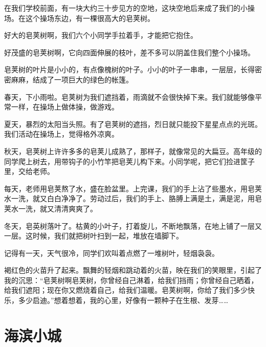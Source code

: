 \documentclass[12pt,UTF-8,openany]{ctexbook}
\begin{document}
\begin{Large}
    
    在我们学校前面，有一块大约三十步见方的空地，这块空地后来成了我们的小操场。在这个操场东边，有一棵很高大的皂荚树。
    
    好大的皂荚树啊，我们六个小同学手拉着手，才能把它抱住。
    
    好茂盛的皂荚树啊，它向四面伸展的枝叶，差不多可以阴盖住我们整个小操场。
    
    皂荚树的叶片是小小的，有点像槐树的叶子。小小的叶子一串串，一层层，长得密密麻麻，结成了一项巨大的绿色的帐篷。
    
    春天，下小雨啦。皂荚树为我们遮挡着，雨滴就不会很快掉下来。我们就能够像平常一样，在操场上做体操，做游戏。
    
    夏天，暴烈的太阳当头照。有了皂荚树的遮挡，烈日就只能投下星星点点的光斑。我们活动在操场上，觉得格外凉爽。
    
    秋天，皂荚树上许许多多的皂荚儿成熟了，那样子，就像常见的大扁豆。高年级的同学爬上树去，用带钩子的小竹竿把皂荚儿构下来。小同学呢，把它们捡进筐子里，交给老师。
    
    每天，老师用皂荚熬了水，盛在脸盆里。上完课，我们的手上沾了些墨水，用皂荚水一洗，就又白白净净了。劳动过后，我们的手上、胳膊上满是土，满是泥，用皂荚水一洗，就又清清爽爽了。
    
    冬天，皂英树落叶了。枯黄的小叶子，打着旋儿，不断地飘落，在地上铺了一层又一层。这时候，我们就把树叶扫到一起，堆放在墙脚下。
    
    记得有一天，天气很冷，同学们欢叫着点燃了一堆树叶，轻烟袅袅。
    
    褐红色的火苗升了起来。飘舞的轻烟和跳动着的火苗，映在我们的笑眼里，引起了我的沉思：“皂荚树啊皂荚树，你曾经自己淋着，给我们挡雨；你曾经自己晒着，给我们遮阳；现在你又燃烧着自己，给我们温暖。皂荚树啊，你给了我们多少快乐，多少启迪。”想着想着，我的心里，好像有一颗种子在生根、发芽……
    
\end{Large}

\chapter{海滨小城}
\end{document}
